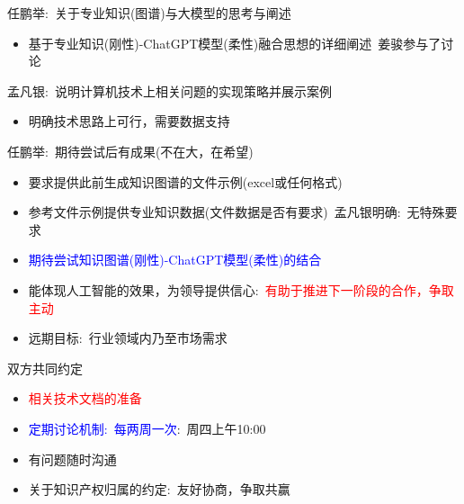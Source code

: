 {任鹏举}:~关于专业知识(图谱)与大模型的思考与阐述
\begin{itemize}
	\item 基于专业知识(刚性)-\textrm{ChatGPT}模型(柔性)融合思想的详细阐述~姜骏参与了讨论
\end{itemize}

{孟凡银}:~说明计算机技术上相关问题的实现策略并展示案例
\begin{itemize}
	\item 明确技术思路上可行，需要数据支持
\end{itemize}

		
{任鹏举}:~期待尝试后有成果(不在大，在希望)
\begin{itemize}
	\item 要求提供此前生成知识图谱的文件示例(\textrm{excel}或任何格式)
	\item 参考文件示例提供专业知识数据(文件数据是否有要求)~孟凡银明确:~无特殊要求
	\item \textcolor{blue}{期待尝试知识图谱(刚性)-\textrm{ChatGPT}模型(柔性)的结合}
	\item 能体现人工智能的效果，为领导提供信心:~\textcolor{red}{有助于推进下一阶段的合作，争取主动}
	\item 远期目标:~行业领域内乃至市场需求
\end{itemize}

{双方共同约定}
\begin{itemize}
	\item \textcolor{red}{相关技术文档的准备}
	\item \textcolor{blue}{定期讨论机制:~每两周一次}:~周四上午\textrm{10:00}
	\item 有问题随时沟通
	\item 关于知识产权归属的约定:~友好协商，争取共赢
\end{itemize}
